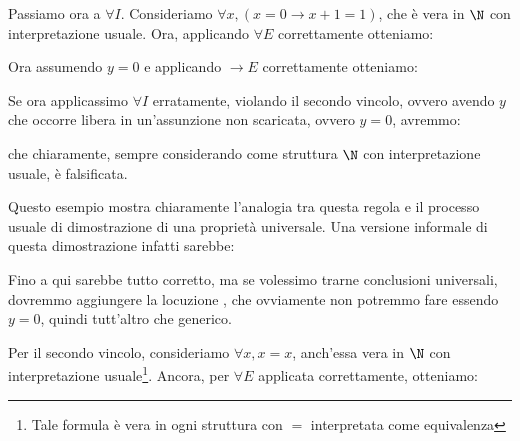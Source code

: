 Passiamo ora a \(\forall I\). Consideriamo \(\forall x, (x=0\to x+1=1)\), che è vera in \(\N\) con interpretazione usuale. Ora, applicando \(\forall E\) correttamente otteniamo:

\begin{prooftree}
\end{prooftree}

Ora assumendo \(y=0\) e applicando \(\to E\) correttamente otteniamo:

\begin{prooftree}
\end{prooftree}

Se ora applicassimo \(\forall I\) erratamente, violando il secondo vincolo, ovvero avendo \(y\) che occorre libera in un'assunzione non scaricata, ovvero \(y=0\), avremmo:

\begin{prooftree}
\end{prooftree}
che chiaramente, sempre considerando come struttura \(\N\) con interpretazione usuale, è falsificata.

Questo esempio mostra chiaramente l'analogia tra questa regola e il processo usuale di dimostrazione di una proprietà universale. Una versione informale di questa dimostrazione infatti sarebbe:
\begin{quote}
\end{quote}

Fino a qui sarebbe tutto corretto, ma se volessimo trarne conclusioni universali, dovremmo aggiungere la locuzione , che ovviamente non potremmo fare essendo \(y=0\), quindi tutt'altro che generico.

Per il secondo vincolo, consideriamo \(\forall x, x=x\), anch'essa vera in \(\N\) con interpretazione usuale\footnote{Tale formula è vera in ogni struttura con \(=\) interpretata come equivalenza}. Ancora, per \(\forall E\) applicata correttamente, otteniamo:

